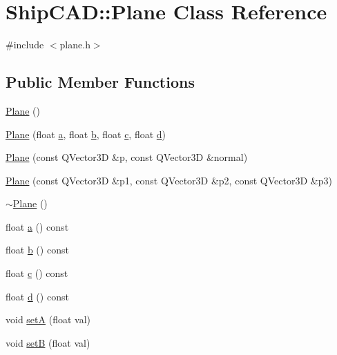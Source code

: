 \hypertarget{classShipCAD_1_1Plane}{}\section{Ship\+C\+AD\+:\+:Plane Class Reference}
\label{classShipCAD_1_1Plane}


{\ttfamily \#include $<$plane.\+h$>$}

\subsection*{Public Member Functions}
\begin{DoxyCompactItemize}
\item 
\hyperlink{classShipCAD_1_1Plane_acac0d9c003e0ab10d07b146c3566a0c7}{Plane} ()
\item 
\hyperlink{classShipCAD_1_1Plane_a9a1420228e8baa632c7e8ba66f27772f}{Plane} (float \hyperlink{classShipCAD_1_1Plane_a1105f3715d9593c0971e0b0959859a84}{a}, float \hyperlink{classShipCAD_1_1Plane_adf79c9ba86dd3112fc098141195fcac5}{b}, float \hyperlink{classShipCAD_1_1Plane_a01b0067ca1a669aef5a8ab85bfce41cc}{c}, float \hyperlink{classShipCAD_1_1Plane_a7755d7967aae2e083c5d08fed49d9eef}{d})
\item 
\hyperlink{classShipCAD_1_1Plane_a254ddea0d760646007a19512e502e6fc}{Plane} (const Q\+Vector3D \&p, const Q\+Vector3D \&normal)
\item 
\hyperlink{classShipCAD_1_1Plane_adbaa1f5c7100e5592312359cb8eede37}{Plane} (const Q\+Vector3D \&p1, const Q\+Vector3D \&p2, const Q\+Vector3D \&p3)
\item 
\hyperlink{classShipCAD_1_1Plane_aff2204f8b2b25c201d172d4ec2518c77}{$\sim$\+Plane} ()
\item 
float \hyperlink{classShipCAD_1_1Plane_a1105f3715d9593c0971e0b0959859a84}{a} () const 
\item 
float \hyperlink{classShipCAD_1_1Plane_adf79c9ba86dd3112fc098141195fcac5}{b} () const 
\item 
float \hyperlink{classShipCAD_1_1Plane_a01b0067ca1a669aef5a8ab85bfce41cc}{c} () const 
\item 
float \hyperlink{classShipCAD_1_1Plane_a7755d7967aae2e083c5d08fed49d9eef}{d} () const 
\item 
void \hyperlink{classShipCAD_1_1Plane_a383a2f49031b8bcfa04be06035836a05}{setA} (float val)
\item 
void \hyperlink{classShipCAD_1_1Plane_aab7d46cba75a32089644b183e0a82dff}{setB} (float val)
\item 

\end{DoxyCompactItemize}
